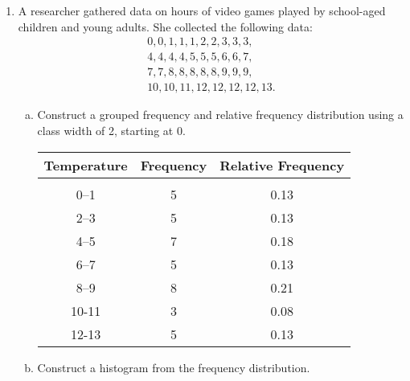 \begin{enumerate}
\begin{enumerate}[(a)]
\end{enumerate}

\item A researcher gathered data on hours of video games played by school-aged children and young adults. She collected the following data: \begin{align*}0, 0, 1, 1, 1, 2, 2, 3, 3, 3,\\ 4, 4, 4, 4, 5, 5, 5, 6, 6, 7,\\ 7, 7, 8, 8, 8, 8, 8, 9, 9, 9,\\ 10, 10, 11, 12, 12, 12, 12, 13. \end{align*}
\begin{enumerate}[(a)]
\item Construct a grouped frequency and relative frequency distribution using a class width of 2, starting at 0.

\begin{center}
\begin{tabular}{c c c}
\textbf{Temperature} & \textbf{Frequency} & \textbf{Relative Frequency}\\
\hline
& & \\
0--1 & 5 & 0.13\\
2--3 & 5 & 0.13\\
4--5 & 7 & 0.18\\
6--7 & 5 & 0.13\\
8--9 & 8 & 0.21\\
10-11 & 3 & 0.08\\
12-13 & 5 & 0.13
\end{tabular}
\end{center}
\pagebreak

\item Construct a histogram from the frequency distribution. 

\begin{center}
\end{center}

\end{enumerate}
\end{enumerate}

